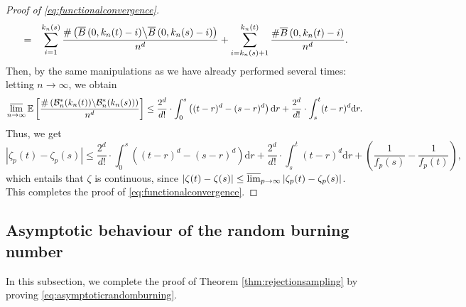 \documentclass[a4paper,11pt]{article}
\begin{document}
\begin{proof}[Proof of \eqref{eq:functionalconvergence}]
\begin{eqnarray*}
&=&\sum_{i=1}^{k_n(s)}\frac{\#\left(\overline{B}\left(0,k_n(t)-i\right)\middle\backslash\overline{B}\left(0,k_n(s)-i\right)\right)}{n^d}+\sum_{i=k_n(s)+1}^{k_n(t)}\frac{\#\overline{B}\left(0,k_n(t)-i\right)}{n^d}.
\end{eqnarray*}
Then, by the same manipulations as we have already performed several times: letting $n\to\infty$, we obtain
\[\varlimsup_{n\to\infty}\mathbb{E}\left[\frac{\#\left(\mathcal{B}_n^*(k_n(t))\middle\backslash\mathcal{B}_n^*(k_n(s))\right)}{n^d}\right]\leq\frac{2^d}{d!}\cdot\int_0^s\left((t-r)^d-(s-r)^d\right)\mathrm{d}r+\frac{2^d}{d!}\cdot\int_s^t(t-r)^d\mathrm{d}r.\]
Thus, we get
\[|\zeta_p(t)-\zeta_p(s)|\leq\frac{2^d}{d!}\cdot\int_0^s\left((t-r)^d-(s-r)^d\right)\mathrm{d}r+\frac{2^d}{d!}\cdot\int_s^t(t-r)^d\mathrm{d}r+\left(\frac{1}{f_p(s)}-\frac{1}{f_p(t)}\right),\]
which entails that $ \zeta$ is continuous, since $|\zeta(t)-\zeta(s)|\leq\varlimsup_{p\to\infty}|\zeta_p(t)-\zeta_p(s)|$.
This completes the proof of \eqref{eq:functionalconvergence}.
\end{proof}

\subsection{Asymptotic behaviour of the random burning number}\label{subsec:asymptoticrandomburning}

In this subsection, we complete the proof of Theorem \ref{thm:rejectionsampling} by proving \eqref{eq:asymptoticrandomburning}.
\end{document}
